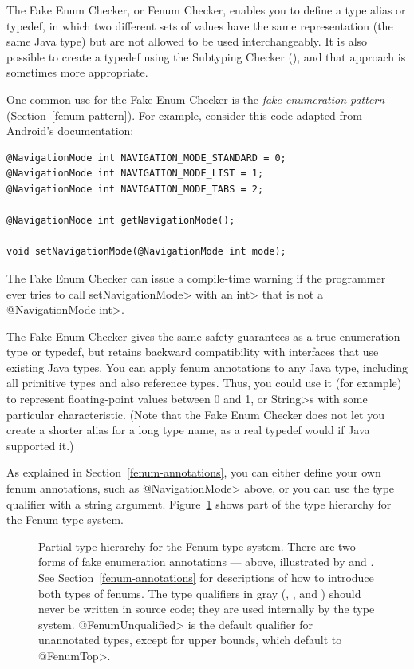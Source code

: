 
The Fake Enum Checker, or Fenum Checker, enables you to define a type alias
or typedef, in which two different sets of values have the same
representation (the same Java type) but are not allowed to be used
interchangeably.  It is also possible to create a typedef using the
Subtyping Checker (), and that approach
is sometimes more appropriate.

One common use for the Fake Enum Checker is the
\emph{fake enumeration pattern} (Section~\ref{fenum-pattern}).  For
example, consider this code adapted from Android's
\href{https://developer.android.com/reference/android/support/annotation/IntDef}{}
documentation:

\begin{Verbatim}
@NavigationMode int NAVIGATION_MODE_STANDARD = 0;
@NavigationMode int NAVIGATION_MODE_LIST = 1;
@NavigationMode int NAVIGATION_MODE_TABS = 2;

@NavigationMode int getNavigationMode();

void setNavigationMode(@NavigationMode int mode);
\end{Verbatim}

The Fake Enum Checker can issue a compile-time warning if the programmer
ever tries to call \<setNavigationMode> with an \<int> that is not a
\<@NavigationMode int>.

The Fake Enum Checker gives the same safety guarantees as a true enumeration
type or typedef, but retains backward compatibility with interfaces that
use existing Java types.  You can apply fenum annotations to any Java type,
including all primitive types and also reference types.  Thus, you could
use it (for example) to represent floating-point values between 0 and 1, or
\<String>s with some particular characteristic.
(Note that the Fake Enum Checker does not let you create a shorter alias
for a long type name, as a real typedef would if Java supported it.)

As explained in Section~\ref{fenum-annotations}, you can either define your
own fenum annotations, such as \<@NavigationMode> above, or you can use the
 type qualifier with a string argument.
Figure~\ref{fig-fenum-hierarchy} shows part of the type hierarchy for the
Fenum type system.

\begin{figure}
\caption{Partial type hierarchy for the Fenum type system.
There are two forms of fake enumeration annotations --- above, illustrated
by  and .
See Section~\ref{fenum-annotations} for descriptions of how to
introduce both types of fenums. The type qualifiers in gray
(,
, and
)
should never be written in
source code; they are used internally by the type system.
\<@FenumUnqualified> is the default qualifier for unannotated types, except
for upper bounds, which default to \<@FenumTop>.
}
\label{fig-fenum-hierarchy}
\end{figure}

